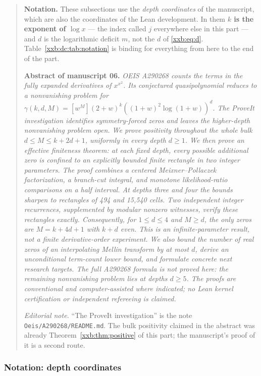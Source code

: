 \documentclass[11pt,a4paper]{article}
\numberwithin{equation}{section}
\theoremstyle{definition}
\theoremstyle{remark}
\theoremstyle{plain}
\begin{document}
\begin{quote}
\smallskip
\textbf{Notation.}  These subsections use the \emph{depth coordinates} of the
manuscript, which are also the coordinates of the Lean development.  In them
\textbf{$k$ is the exponent of $\log x$} --- the index called $j$ everywhere
else in this part --- and $d$ is the logarithmic deficit $m$, not the $d$ of
\eqref{xxb:eq:d}.  Table~\ref{xxb:dc:tab:notation} is binding for everything
from here to the end of the part.

\medskip
\textbf{Abstract of manuscript 06.}\itshape
OEIS A290268 counts the terms in the fully expanded derivatives of
$x^{x^2}$. Its conjectured quasipolynomial reduces to a nonvanishing problem
for $\gamma(k,d,M)=[w^M](2+w)^k((1+w)^2\log(1+w))^d$.
The ProveIt investigation identifies symmetry-forced zeros and leaves the
higher-depth nonvanishing problem open. We prove positivity throughout the
whole bulk $d\le M\le k+2d+1$, uniformly in every depth $d\ge1$.
We then prove an effective finiteness theorem: at each fixed depth, every
possible additional zero is confined to an explicitly bounded finite
rectangle in two integer parameters. The proof combines a centered
Meixner--Pollaczek factorization, a branch-cut integral, and monotone
likelihood-ratio comparisons on a half interval.
At depths three and four the bounds sharpen to rectangles of 494 and
15,540 cells. Two independent integer recurrences, supplemented by modular
nonzero witnesses, verify these rectangles exactly. Consequently, for
$1\le d\le4$ and $M\ge d$, the only zeros are
$M=k+4d+1$ with $k+d$ even. This is an infinite-parameter result, not a
finite derivative-order experiment. We also bound the number of real
zeros of an interpolating Mellin transform by at most $d$, derive an
unconditional term-count lower bound, and formulate concrete next research
targets. The full A290268 formula is not proved here: the remaining
nonvanishing problem lies at depths $d\ge5$. The proofs are conventional
and computer-assisted where indicated; no Lean kernel certification or
independent refereeing is claimed.
\upshape\par
\smallskip
\emph{Editorial note.}  ``The ProveIt investigation'' is the note
\texttt{Oeis/A290268/README.md}.  The bulk positivity claimed in the abstract
was already Theorem~\ref{xxb:thm:positive} of this part; the manuscript's
proof of it is a second route.
\end{quote}

\subsubsection{Notation: depth coordinates}\label{xxb:dc:sec:notation}
\end{document}
